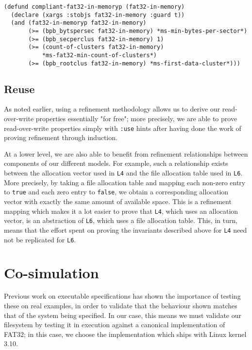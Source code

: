 \documentclass[submission,copyright,creativecommons]{eptcs}
\begin{document}
\medskip

\noindent
\begin{verbatim}
(defund compliant-fat32-in-memoryp (fat32-in-memory)
  (declare (xargs :stobjs fat32-in-memory :guard t))
  (and (fat32-in-memoryp fat32-in-memory)
       (>= (bpb_bytspersec fat32-in-memory) *ms-min-bytes-per-sector*)
       (>= (bpb_secperclus fat32-in-memory) 1)
       (>= (count-of-clusters fat32-in-memory)
           *ms-fat32-min-count-of-clusters*)
       (>= (bpb_rootclus fat32-in-memory) *ms-first-data-cluster*)))
\end{verbatim}

\subsection{Reuse}

As noted earlier, using a refinement methodology allows us to derive
our read-over-write properties essentially "for free"; more precisely,
we are able to prove read-over-write properties simply with
\texttt{:use} hints after having done the work of proving refinement
through induction.

At a lower level, we are also able to benefit from refinement
relationships between components of our different models. For example,
such a relationship exists between the allocation vector used in
\texttt{L4} and the file allocation table used in \texttt{L6}. More
precisely, by taking a file allocation table and mapping each non-zero
entry to \texttt{true} and each zero entry to \texttt{false}, we
obtain a corresponding allocation vector with exactly the same amount
of available space. This is a refinement mapping which makes it a lot
easier to prove that \texttt{L4}, which uses an allocation vector, is
an abstraction of \texttt{L6}, which uses a file allocation
table. This, in turn, means that the effort spent on proving the
invariants described above for \texttt{L4} need not be replicated for
\texttt{L6}.

\section{Co-simulation}

Previous work on executable specifications \cite{goel2014simulation}
has shown the importance of testing these on real examples, in order
to validate that the behaviour shown matches that of the system being
specified. In our case, this means we must validate our filesystem by
testing it in execution against a canonical implementation of FAT32;
in this case, we choose the implementation which ships with Linux
kernel 3.10.
\end{document}
